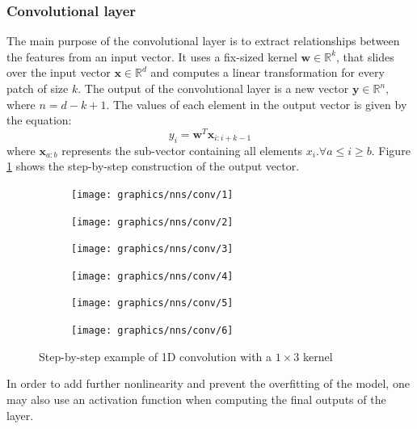 	\subsubsection*{Convolutional layer}
	The main purpose of the convolutional layer is to extract relationships between the features from an input vector. It uses a fix-sized kernel $\mathbf{w} \in \mathbb{R}^k$, that slides over the input vector $\mathbf{x}\in\mathbb{R}^d$ and computes a linear transformation for every patch of size $k$. The output of the convolutional layer is a new vector $\mathbf{y}\in\mathbb{R}^n$, where $n=d - k + 1$. The values of each element in the output vector is given by the equation:
	\begin{equation}
		y_i = \mathbf{w}^T\mathbf{x}_{i:i+k-1}
	\end{equation}
	where $\mathbf{x}_{a:b}$ represents the sub-vector containing all elements $x_i. \forall a\leq i \geq b$. Figure \ref{Fig: prep/ml/cnn/convoLayer} shows the step-by-step construction of the output vector.
	\begin{figure}[H]
		\centering
		\begin{subfigure}[b]{0.3\linewidth}
			\texttt{[image: graphics/nns/conv/1]}
			\vspace*{1cm}
		\end{subfigure}
		\begin{subfigure}[b]{0.3\linewidth}
			\texttt{[image: graphics/nns/conv/2]}
			\vspace*{1cm}
		\end{subfigure}
		\begin{subfigure}[b]{0.3\linewidth}
			\texttt{[image: graphics/nns/conv/3]}
			\vspace*{1cm}
		\end{subfigure}
		\begin{subfigure}[b]{0.3\linewidth}
			\texttt{[image: graphics/nns/conv/4]}
		\end{subfigure}
		\begin{subfigure}[b]{0.3\linewidth}
			\texttt{[image: graphics/nns/conv/5]}
		\end{subfigure}
		\begin{subfigure}[b]{0.3\linewidth}
			\texttt{[image: graphics/nns/conv/6]}
		\end{subfigure}
		\caption[1D Convolution]{Step-by-step example of 1D convolution with a $1\times3$ kernel}
		\label{Fig: prep/ml/cnn/convoLayer}
	\end{figure}
	In order to add further nonlinearity and prevent the overfitting of the model, one may also use an activation function when computing the final outputs of the layer. 
